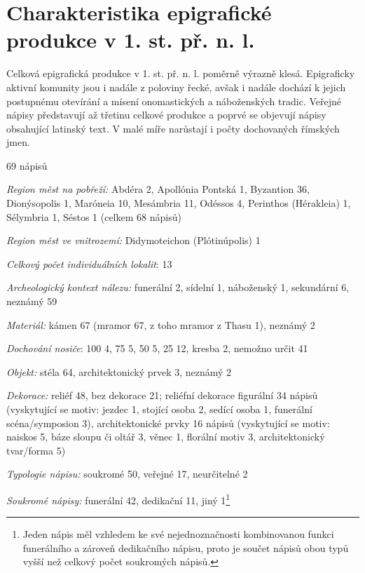 \section[charakteristika-epigrafické-produkce-v-1.-st.-př.-n.-l.]{Charakteristika epigrafické produkce v 1. st. př. n. l.}

Celková epigrafická produkce v 1. st. př. n. l. poměrně výrazně klesá. Epigraficky aktivní komunity jsou i nadále z poloviny řecké, avšak i nadále dochází k jejich postupnému otevírání a mísení onomastických a náboženských tradic. Veřejné nápisy představují až třetinu celkové produkce a poprvé se objevují nápisy obsahující latinský text. V malé míře narůstají i počty dochovaných římských jmen.

\placetable[none]{}
\starttable[|l|]
\HL
{} 69 nápisů

{\em Region měst na pobřeží:} Abdéra 2, Apollónia Pontská 1, Byzantion 36, Dionýsopolis 1, Maróneia 10, Mesámbria 11, Odéssos 4, Perinthos (Hérakleia) 1, Sélymbria 1, Séstos 1 (celkem 68 nápisů)

{\em Region měst ve vnitrozemí:} Didymoteichon (Plótinúpolis) 1

{\em Celkový počet individuálních lokalit}: 13

{\em Archeologický kontext nálezu:} funerální 2, sídelní 1, náboženský 1, sekundární 6, neznámý 59

{\em Materiál:} kámen 67 (mramor 67, z toho mramor z Thasu 1), neznámý 2

{\em Dochování nosiče}: 100  4, 75  5, 50  5, 25  12, kresba 2, nemožno určit 41

{\em Objekt:} stéla 64, architektonický prvek 3, neznámý 2

{\em Dekorace:} reliéf 48, bez dekorace 21; reliéfní dekorace figurální 34 nápisů (vyskytující se motiv: jezdec 1, stojící osoba 2, sedící osoba 1, funerální scéna/symposion 3), architektonické prvky 16 nápisů (vyskytující se motiv: naiskos 5, báze sloupu či oltář 3, věnec 1, florální motiv 3, architektonický tvar/forma 5)

{\em Typologie nápisu:} soukromé 50, veřejné 17, neurčitelné 2

{\em Soukromé nápisy:} funerální 42, dedikační 11, jiný 1\footnote{Jeden nápis měl vzhledem ke své nejednoznačnosti kombinovanou funkci funerálního a zároveň dedikačního nápisu, proto je součet nápisů obou typů vyšší než celkový počet soukromých nápisů.}

